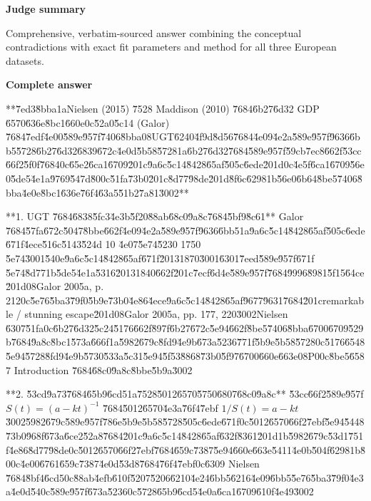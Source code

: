\documentclass[10pt]{article}
\begin{document}
\textbf{Judge summary}
\begin{EvidenceText}
Comprehensive, verbatim-sourced answer combining the conceptual contradictions with exact fit parameters and method for all three European datasets.
\end{EvidenceText}

\textbf{Complete answer}
\begin{AnswerText}
**\u7ed3\u8bba\uff1aNielsen (2015) \u7528 Maddison (2010) \u7684\u6b27\u6d32 GDP \u6570\u636e\u8bc1\u660e\uff0c\u52a0\u5c14 (Galor) \u7684\u7edf\u4e00\u589e\u957f\u7406\u8bba\uff08UGT\u6240\u4f9d\u8d56\u7684\u4e09\u4e2a\u589e\u957f\u9636\u6bb5\u5728\u6b27\u6d32\u6839\u672c\u4e0d\u5b58\u5728\uff1a\u6b27\u6d32\u7684\u589e\u957f\u59cb\u7ec8\u662f\u53cc\u66f2\u5f0f\u7684\uff0c\u65e2\u6ca1\u6709\u201c\u9a6c\u5c14\u8428\u65af\u505c\u6ede\u201d\uff0c\u4e5f\u6ca1\u6709\u56e0\u5de5\u4e1a\u9769\u547d\u800c\u51fa\u73b0\u201c\u8d77\u98de\u201d\u8f6c\u6298\uff1b\u56e0\u6b64\u8be5\u7406\u8bba\u4e0e\u8bc1\u636e\u76f4\u63a5\u51b2\u7a81\u3002**

**1. UGT \u7684\u6838\u5fc3\u4e3b\u5f20\u88ab\u68c0\u9a8c\u7684\u5bf9\u8c61**
Galor \u7684\u57fa\u672c\u5047\u8bbe\u662f\u4e09\u4e2a\u589e\u957f\u9636\u6bb5\uff1a\u9a6c\u5c14\u8428\u65af\u505c\u6ede\u671f\u4ece\u516c\u5143\u524d 10 \u4e07\u5e74\u5230 1750 \u5e74\u3001\u540e\u9a6c\u5c14\u8428\u65af\u671f\u20131870\u3001\u6301\u7eed\u589e\u957f\u671f \u5e74\u8d77\uff1b\u5de5\u4e1a\u5316\u20131840\u662f\u201c\u7ecf\u6d4e\u589e\u957f\u7684\u9996\u8981\u5f15\u64ce\u201d\uff08Galor 2005a, p. 212\uff0c\u5e76\u5ba3\u79f0\u5b9e\u73b0\u4e86\u4ece\u9a6c\u5c14\u8428\u65af\u9677\u9631\u7684\u201cremarkable / stunning escape\u201d\uff08Galor 2005a, pp. 177, 220\u3002Nielsen \u6307\u51fa\uff0c\u6b27\u6d32\u5c24\u5176\u662f\u897f\u6b27\u672c\u5e94\u662f\u8be5\u7406\u8bba\u6700\u6709\u529b\u7684\u9a8c\u8bc1\u573a\u666f\uff1a\u5982\u679c\u8fd9\u4e9b\u673a\u5236\u771f\u5b9e\u5b58\u5728\uff0c\u5176\u6548\u5e94\u5728\u8fd9\u4e9b\u5730\u533a\u5c31\u5e94\u5f53\u8868\u73b0\u5f97\u6700\u660e\u663e\uff08P0\uff0c\u8be5\u6587 Introduction \u7684\u68c0\u9a8c\u8bbe\u5b9a\u3002

**2. \u53cd\u9a73\u7684\u65b9\u6cd5\uff1a\u7528\u5012\u6570\u5750\u6807\u68c0\u9a8c**
\u53cc\u66f2\u589e\u957f $S(t)=(a-kt)^{-1}$ \u7684\u5012\u6570\u4e3a\u76f4\u7ebf $1/S(t)=a-kt$\u3002\u5982\u679c\u589e\u957f\u786e\u5b9e\u5b58\u5728\u505c\u6ede\u671f\uff0c\u5012\u6570\u66f2\u7ebf\u5e94\u5448\u73b0\u968f\u673a\u6ce2\u52a8\u7684\u201c\u9a6c\u5c14\u8428\u65af\u632f\u8361\u201d\uff1b\u5982\u679c\u53d1\u751f\u4e86\u8d77\u98de\uff0c\u5012\u6570\u66f2\u7ebf\u7684\u659c\u7387\u5e94\u660e\u663e\u5411\u4e0b\u504f\u6298\uff1b\u800c\u4e00\u6761\u659c\u7387\u4e0d\u53d8\u7684\u76f4\u7ebf\uff0c\u6309 Nielsen \u7684\u8bf4\u6cd5\uff0c\u88ab\u4efb\u610f\u5207\u5206\u6210\u4e24\u6bb5\u6216\u4e09\u6bb5\u5e76\u5ba3\u79f0\u4e3a\u4e0d\u540c\u589e\u957f\u673a\u5236\uff0c\u5728\u65b9\u6cd5\u4e0a\u6ca1\u6709\u610f\u4e49\u3002


\end{AnswerText}
\end{document}
